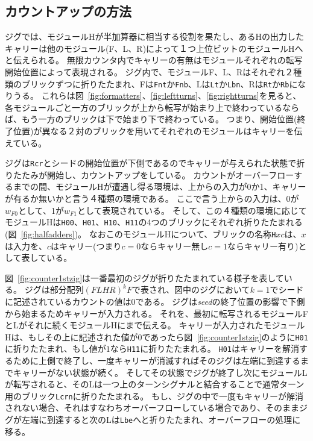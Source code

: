 \documentclass[a4,11pt]{article}
\begin{document}
%
\newpage
%

\subsection{カウントアップの方法}
ジグでは、モジュールHが半加算器に相当する役割を果たし、あるHの出力したキャリーは他のモジュール(F、L、R)によって１つ上位ビットのモジュールHへと伝えられる。
無限カウンタ内でキャリーの有無はモジュールそれぞれの転写開始位置によって表現される。
ジグ内で、モジュールF、L、Rはそれぞれ２種類のブリックずつに折りたたまれ、Fは\texttt{Fnt}か\texttt{Fnb}、Lは\texttt{Lt}か\texttt{Lbn}、Rは\texttt{Rt}か\texttt{Rb}になりうる。
これらは図~\ref{fig:formatters}、\ref{fig:leftturns}、\ref{fig:rightturns}を見ると、各モジュールごと一方のブリックが上から転写が始まり上で終わっているならば、もう一方のブリックは下で始まり下で終わっている。
つまり、開始位置(終了位置)が異なる２対のブリックを用いてそれぞれのモジュールはキャリーを伝えている。

ジグは\texttt{Rcr}とシードの開始位置が下側であるのでキャリーが与えられた状態で折りたたみが開始し、カウントアップをしている。
カウントがオーバーフローするまでの間、モジュールHが遭遇し得る環境は、上からの入力が0か1、キャリーが有るか無いかと言う４種類の環境である。
ここで言う上からの入力は、0が$w_{F0}$として、1が$w_{F1}$として表現されている。
そして、この４種類の環境に応じてモジュールHは\texttt{H00}、\texttt{H01}、\texttt{H10}、\texttt{H11}の4つのブリックにそれぞれ折りたたまれる(図~\ref{fig:halfadders})。
なおこのモジュールHについて、ブリックの名称\texttt{H}$xc$は、$x$は入力を、$c$はキャリー(つまり$c=0$ならキャリー無し$c=1$ならキャリー有り)として表している。

図~\ref{fig:counter1stzig}は一番最初のジグが折りたたまれている様子を表している。
ジグは部分配列$(FLHR)^kF$で表され、図中のジグにおいて$k=1$でシードに記述されているカウントの値は$0$である。
ジグは\textit{seed}の終了位置の影響で下側から始まるためキャリーが入力される。
それを、最初に転写されるモジュールFとLがそれに続くモジュールHにまで伝える。
キャリーが入力されたモジュールHは、もしその上に記述された値が$0$であったら図~\ref{fig:counter1stzig}のように\texttt{H01}に折りたたまれ、もし値が$1$なら\texttt{H11}に折りたたまれる。
\texttt{H01}はキャリーを解消するために上側で終了し、一度キャリーが消滅すればそのジグは左端に到達するまでキャリーがない状態が続く。
そしてその状態でジグが終了し次にモジュールLが転写されると、そのLは一つ上のターンシグナルと結合することで通常ターン用のブリック\texttt{Lcrn}に折りたたまれる。
もし、ジグの中で一度もキャリーが解消されない場合、それはすなわちオーバーフローしている場合であり、そのままジグが左端に到達すると次のLは\texttt{Lbe}へと折りたたまれ、オーバーフローの処理に移る。
\end{document}
